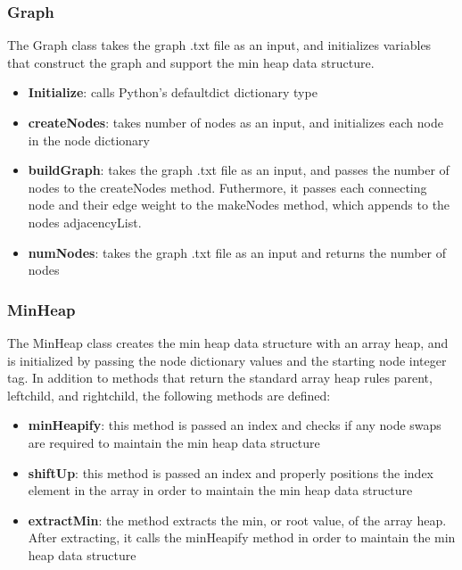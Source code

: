 	\subsubsection{Graph}
	The Graph class takes the graph .txt file as an input, and initializes variables that construct the graph and support the min heap data structure.  
	\begin{itemize}
	\item \textbf{Initialize}: calls Python's defaultdict dictionary type
	\item \textbf{createNodes}: takes number of nodes as an input, and initializes each node in the node dictionary
	\item \textbf{buildGraph}: takes the graph .txt file as an input, and passes the number of nodes to the createNodes method. Futhermore, it passes each connecting node and their edge weight to the makeNodes method, which appends to the nodes adjacencyList. 
	\item \textbf{numNodes}: takes the graph .txt file as an input and returns the number of nodes
	\end{itemize}	
	\subsubsection{MinHeap} The MinHeap class creates the min heap data structure with an array heap, and is initialized by passing the node dictionary values and the starting node integer tag. In addition to methods that return the standard array heap rules parent, leftchild, and rightchild, the following methods are defined:
	\begin{itemize}
	\item \textbf{minHeapify}: this method is passed an index and checks if any node swaps are required to maintain the min heap data structure
	\item \textbf{shiftUp}: this method is passed an index and properly positions the index element in the array in order to maintain the min heap data structure
	\item \textbf{extractMin}: the method extracts the min, or root value, of the array heap. After extracting, it calls the minHeapify method in order to maintain the min heap data structure
	\end{itemize}
	

